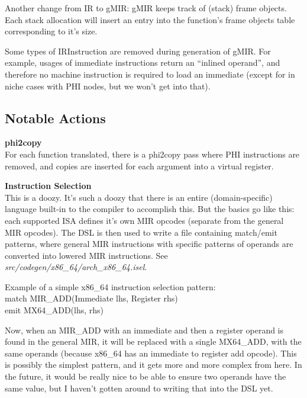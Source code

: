 \documentclass[12pt]{article}
\begin{document}
Another change from IR to gMIR: gMIR keeps track of (stack) frame objects. Each stack allocation will insert an entry into the function's frame objects table corresponding to it's size.

Some types of IRInstruction are removed during generation of gMIR. For example, usages of immediate instructions return an ``inlined operand'', and therefore no machine instruction is required to load an immediate (except for in niche cases with PHI nodes, but we won't get into that).


\subsection{Notable Actions}
\label{subsec:general-machine-ir:notable-actions}

\noindent\textbf{phi2copy}\\
\indent For each function translated, there is a phi2copy pass where PHI instructions are removed, and copies are inserted for each argument into a virtual register.

\noindent\textbf{Instruction Selection}\\
\indent This is a doozy. It's such a doozy that there is an entire (domain-specific) language built-in to the compiler to accomplish this. But the basics go like this: each supported ISA defines it's own MIR opcodes (separate from the general MIR opcodes). The DSL is then used to write a file containing match/emit patterns, where general MIR instructions with specific patterns of operands are converted into lowered MIR instructions. See \emph{src/codegen/x86\_64/arch\_x86\_64.isel}.

\vspace{1ex}
Example of a simple x86\_64 instruction selection pattern:\\
\indent \indent match MIR\_ADD(Immediate lhs, Register rhs)\\
\indent \indent emit MX64\_ADD(lhs, rhs)
\vspace{1ex}

Now, when an MIR\_ADD with an immediate and then a register operand is found in the general MIR, it will be replaced with a single MX64\_ADD, with the same operands (because x86\_64 has an immediate to register add opcode). This is possibly the simplest pattern, and it gets more and more complex from here. In the future, it would be really nice to be able to ensure two operands have the same value, but I haven't gotten around to writing that into the DSL yet.
\end{document}
